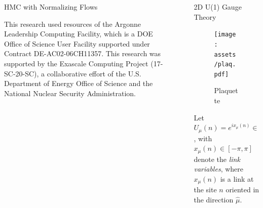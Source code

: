 \documentclass[final]{beamer}
\newlength{\sepwidth}
\newlength{\colwidth}
\newcommand{\separatorcolumn}{\begin{column}{\sepwidth}\end{column}}
\begin{document}
\begin{frame}[t]
\begin{columns}[t]
\begin{column}{\colwidth}
\begin{block}{HMC with Normalizing Flows}
  \vspace{\baselineskip}

    \begin{footnotesize}
      \alert{This research used resources of the Argonne Leadership Computing Facility, which is a DOE Office of Science User
      Facility supported under Contract DE-AC02-06CH11357.  This research was supported by the Exascale Computing
      Project (17-SC-20-SC), a collaborative effort of the U.S. Department of Energy Office of Science and the National
    Nuclear Security Administration.}
  \end{footnotesize}
  \end{block}


\end{column}

\separatorcolumn

\begin{column}{\colwidth}
  \begin{block}{2D U(1) Gauge Theory}
    \begin{figure}
      \texttt{[image: assets/plaq.pdf]}
      \caption{\label{fig:plaquette}Plaquette}%
    \end{figure}
    Let \(U_{\mu}(n) = e^{i x_{\mu}(n)} \in U(1)\), with \(x_{\mu}(n) \in \left[-\pi, \pi\right]\) denote the \emph{link
    variables}, where \(x_{\mu}(n)\) is a link at the site \(n\) oriented in the direction \(\hat\mu\).


\end{block}
\end{column}
\end{columns}
\end{frame}
\end{document}
